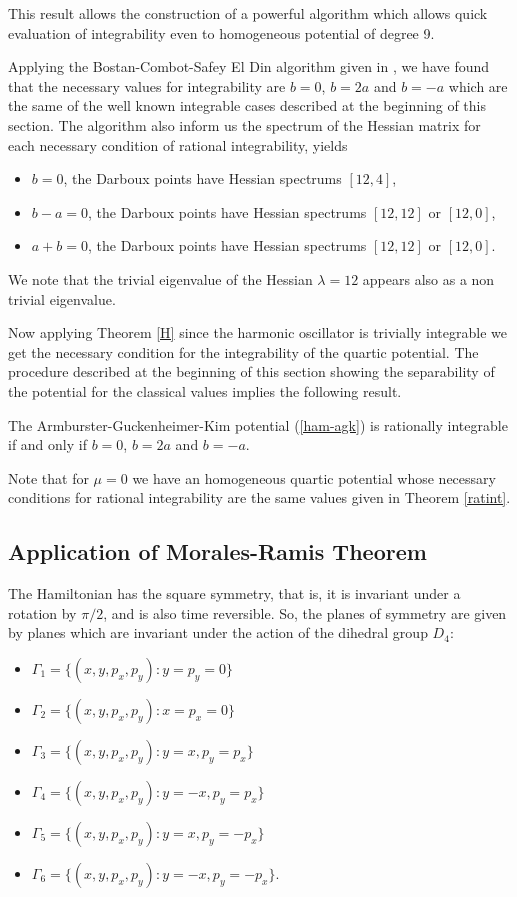 \documentclass[final]{siamart0516}
\begin{document}
This result allows the construction of a powerful algorithm which
 allows quick evaluation of integrability even to homogeneous potential of degree 9.

Applying the Bostan-Combot-Safey El Din algorithm given in \cite{combot}, we have found that the necessary values for integrability are $b=0$, $b=2a$ and $b=-a$ which
are the same of the well known integrable cases described at the beginning of this section.  The algorithm also inform us the spectrum of the
Hessian matrix for each necessary condition of rational integrability, yields
\begin{itemize}
\item $b=0$, the Darboux points have Hessian spectrums $[12,4]$,
\item $b-a=0$, the Darboux points have Hessian spectrums  $[12,12]$ or $[12,0]$,
\item $a+b=0$, the Darboux points have Hessian spectrums $[12,12]$ or $[12,0]$. \end{itemize}
We note that the trivial eigenvalue of the Hessian $\lambda=12$ appears also as a non trivial eigenvalue.


Now applying Theorem \ref{H} since the harmonic oscillator is trivially integrable we get the necessary condition for the integrability of the quartic
potential. The procedure described at the beginning of this section showing the separability of the potential for the classical values implies the following result.
\begin{theorem}\label{ratint}
The Armburster-Guckenheimer-Kim potential (\ref{ham-agk}) is rationally integrable if and only if $b = 0$, $b=2a$ and $b=-a$. 
\end{theorem}

Note that for $\mu =0$ we have an homogeneous quartic potential  whose 
necessary conditions for rational  integrability are  the same values given in Theorem \ref{ratint}.
 

\subsection{Application of Morales-Ramis Theorem}
The Hamiltonian has the square symmetry, that is, it is invariant under a rotation by $\pi/2$, and is also time reversible.
So, the planes of symmetry are given by  planes which are invariant  under the action of the dihedral group $D_4$:
\begin{itemize}
    \item $\Gamma_1=\{(x,y,p_x,p_y):y=p_y=0\}$
    \item $\Gamma_2=\{(x,y,p_x,p_y):x=p_x=0\}$
    \item $\Gamma_3=\{(x,y,p_x,p_y):y=x,p_y=p_x\}$
    \item $\Gamma_4=\{(x,y,p_x,p_y):y=-x,p_y=p_x\}$
    \item $\Gamma_5=\{(x,y,p_x,p_y):y=x,p_y=-p_x\}$
    \item $\Gamma_6=\{(x,y,p_x,p_y):y=-x,p_y=-p_x\}$.
\end{itemize}
\end{document}
